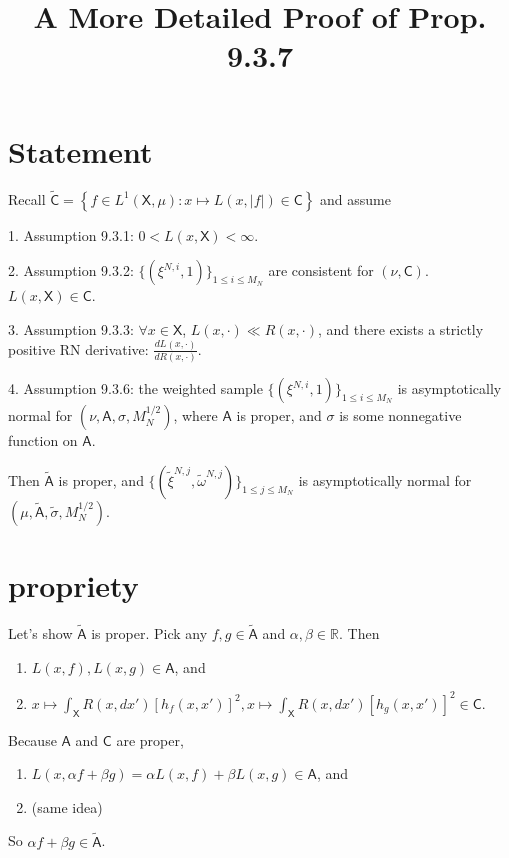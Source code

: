 \documentclass{article}
\title{A More Detailed Proof of Prop. 9.3.7}
\begin{document}
\maketitle


\section{Statement}

Recall $\tilde{\mathsf{C}} = \left\{ f \in L^1(\mathsf{X}, \mu) : x \mapsto L(x, |f|) \in \mathsf{C}  \right\}$ and assume 

1. Assumption 9.3.1: $0 < L(x,\mathsf{X}) < \infty$.

2. Assumption 9.3.2: $\{(\xi^{N,i},1)\}_{1 \le i \le M_N}$ are consistent for $(\nu, \mathsf{C})$. $L(x,\mathsf{X}) \in \mathsf{C}$.

3. Assumption 9.3.3: $\forall x \in \mathsf{X}$, $L(x, \cdot) \ll R(x, \cdot)$, and there exists a strictly positive RN derivative: $\frac{dL(x,\cdot )}{dR(x, \cdot)}$.

4. Assumption 9.3.6: the weighted sample $\{(\xi^{N,i}, 1)\}_{1 \le i \le M_N}$ is asymptotically normal for $(\nu, \mathsf{A}, \sigma, M_N^{1/2})$, where $\mathsf{A}$ is proper, and $\sigma$ is some nonnegative function on $\mathsf{A}$.

Then $\tilde{\mathsf{A}}$ is proper, and $\{ (\tilde{\xi}^{N,j}, \tilde{\omega}^{N,j} )\}_{1 \le j \le M_N}$ is asymptotically normal for $(\mu, \tilde{\mathsf{A}}, \tilde{\sigma}, M_N^{1/2})$.



\section{propriety}

Let's show $\tilde{\mathsf{A}}$ is proper. Pick any $f, g \in \tilde{\mathsf{A}}$ and $\alpha,\beta \in \mathbb{R}$. Then

\begin{enumerate}
\item $L(x,f), L(x,g) \in \mathsf{A}$, and 
\item $x \mapsto \int_{\mathsf{X}} R(x,dx')[h_f(x,x')]^2, x \mapsto \int_{\mathsf{X}} R(x,dx')[h_g(x,x')]^2 \in \mathsf{C}$.
\end{enumerate}
Because $\mathsf{A}$ and $\mathsf{C}$ are proper, 
\begin{enumerate}
\item $L(x,\alpha f + \beta g) = \alpha L(x,f) + \beta L(x,g) \in \mathsf{A}$, and
\item (same idea)
\end{enumerate}
So $\alpha f + \beta g \in \tilde{\mathsf{A}}$.
\end{document}
